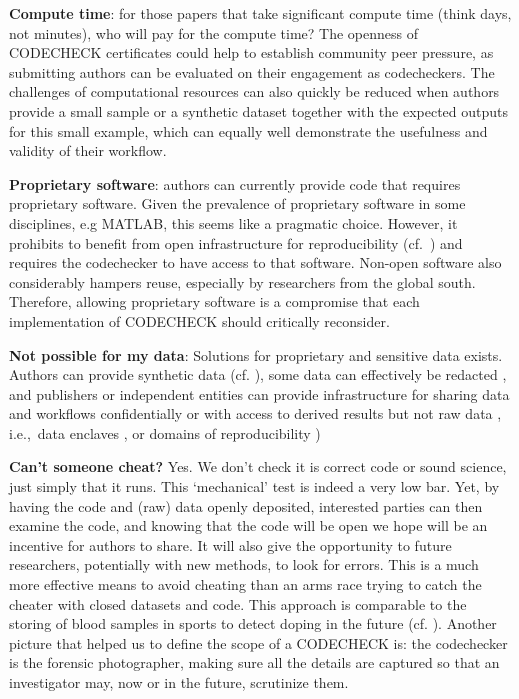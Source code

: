 \documentclass[12pt]{article}
\begin{document}
\textbf{Compute time}: for those papers that take significant compute
time (think days, not minutes), who will pay for the compute time?
The openness of CODECHECK certificates could help to establish community
peer pressure, as submitting authors can be evaluated on their engagement
as codecheckers.
The challenges of computational resources can also quickly be reduced when
authors provide a small sample or a synthetic dataset together with the
expected outputs for this small example, which can equally well demonstrate the 
usefulness and validity of their workflow.

\textbf{Proprietary software}: authors can currently provide code that requires
proprietary software. Given the prevalence of proprietary software in
some disciplines, e.g MATLAB, this seems like a pragmatic choice.
However, it prohibits to benefit from open infrastructure for reproducibility
(cf.~\cite{konkol_publishing_2020,perkel_make_2019})
and requires the codechecker to have access to that software.
Non-open software also considerably hampers reuse, especially by researchers
from the global south. Therefore, allowing proprietary software is a compromise
that each implementation of CODECHECK should critically reconsider.

\textbf{Not possible for my data}: 
Solutions for proprietary and sensitive data exists.
Authors can provide synthetic data (cf. \cite{shannon_opening_2018}), some
data can effectively be redacted \cite{oloughlin_data_2015}, and publishers or
independent entities can provide infrastructure for sharing data and workflows
confidentially \cite{perignon_certify_2019} or with access to derived results
but not raw data \cite{shannon_opening_2018},
i.e.,~data enclaves \cite{foster_research_2018},
or domains of reproducibility \cite{harris_more_2017})

\textbf{Can't someone cheat?} Yes. We don't check it is correct code or
sound science,
just simply that it runs. This `mechanical' test is indeed a very low bar.
Yet, by having the code and (raw) data openly deposited, interested parties can
then examine the code, and knowing that the code will be open we hope will
be an incentive for authors to share. It will also give the opportunity 
to future researchers, potentially with new methods, to look for errors.
This is a much more effective means to avoid cheating than an arms race
trying to catch the cheater with closed datasets and code. This approach
is comparable to the storing of blood samples in sports to detect
doping in the future (cf. \cite{everythinghertz97}).
Another picture that helped us to define the scope of a CODECHECK is:
the codechecker is the forensic photographer, making sure all the details
are captured so that an investigator may, now or in the future, scrutinize
them.
\end{document}
